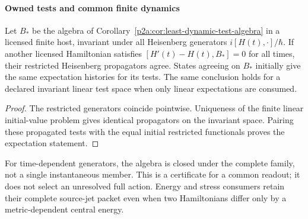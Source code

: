 \documentclass[12pt,a4paper]{article}
\begin{document}
\paragraph{Owned tests and common finite dynamics}
\label{p4:sec:owned-dynamic-tests}
\begin{corollary}
\label{p4:cor:common-flow-dynamic-tests}
Let $B_*$ be the algebra of
Corollary~\ref{p2a:cor:least-dynamic-test-algebra} in a licensed finite
host, invariant under all Heisenberg generators $i[H(t),\cdot]/\hbar$.
If another licensed Hamiltonian satisfies
$[H'(t)-H(t),B_*]=0$ for all times, their restricted Heisenberg
propagators agree. States agreeing on $B_*$ initially give the same
expectation histories for its tests. The same conclusion holds for a
declared invariant linear test space when only linear expectations are
consumed.
\end{corollary}
\begin{proof}
The restricted generators coincide pointwise. Uniqueness of the finite
linear initial-value problem gives identical propagators on the invariant
space. Pairing these propagated tests with the equal initial restricted
functionals proves the expectation statement.
\end{proof}
For time-dependent generators, the algebra is closed under the complete
family, not a single instantaneous member. This is a certificate for a
common readout; it does not select an unresolved full action. Energy and
stress consumers retain their complete source-jet packet even when two
Hamiltonians differ only by a metric-dependent central energy.
\end{document}
